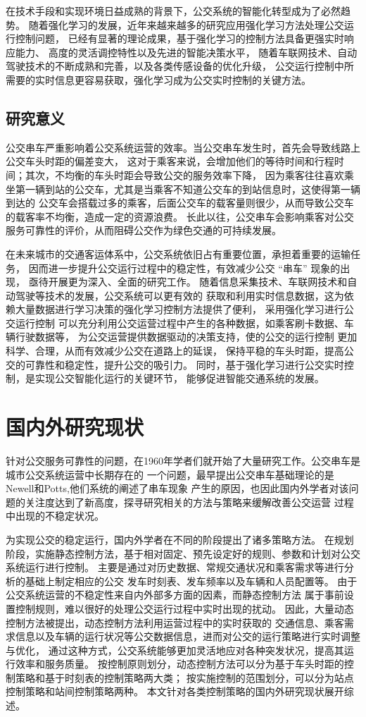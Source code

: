 在技术手段和实现环境日益成熟的背景下，公交系统的智能化转型成为了必然趋势。
随着强化学习的发展，近年来越来越多的研究应用强化学习方法处理公交运行控制问题，
已经有显著的理论成果，基于强化学习的控制方法具备更强实时响应能力、
高度的灵活调控特性以及先进的智能决策水平，
随着车联网技术、自动驾驶技术的不断成熟和完善，以及各类传感设备的优化升级，
公交运行控制中所需要的实时信息更容易获取，强化学习成为公交实时控制的关键方法。

\subsection{研究意义}

公交串车严重影响着公交系统运营的效率。当公交串车发生时，首先会导致线路上公交车头时距的偏差变大，
这对于乘客来说，会增加他们的等待时间和行程时间；其次，不均衡的车头时距会导致公交的服务效率下降，
因为乘客往往喜欢乘坐第一辆到站的公交车，尤其是当乘客不知道公交车的到站信息时，这使得第一辆到达的
公交车会搭载过多的乘客，后面公交车的载客量则很少，从而导致公交车的载客率不均衡，造成一定的资源浪费。
长此以往，公交串车会影响乘客对公交服务可靠性的评价，从而阻碍公交作为绿色交通的可持续发展。

在未来城市的交通客运体系中，公交系统依旧占有重要位置，承担着重要的运输任务，
因而进一步提升公交运行过程中的稳定性，有效减少公交 “串车” 现象的出现，
亟待开展更为深入、全面的研究工作。
随着信息采集技术、车联网技术和自动驾驶等技术的发展，公交系统可以更有效的
获取和利用实时信息数据，这为依赖大量数据进行学习决策的强化学习控制方法提供了便利，
采用强化学习进行公交运行控制
可以充分利用公交运营过程中产生的各种数据，如乘客刷卡数据、车辆行驶数据等，
为公交运营提供数据驱动的决策支持，使的公交的运行控制
更加科学、合理，从而有效减少公交在道路上的延误，
保持平稳的车头时距，提高公交的可靠性和稳定性，提升公交的吸引力。
同时，基于强化学习进行公交实时控制，是实现公交智能化运行的关键环节，
能够促进智能交通系统的发展。

\section{国内外研究现状}
针对公交服务可靠性的问题，在1960年学者们就开始了大量研究工作。公交串车是城市公交系统运营中长期存在的
一个问题，最早提出公交串车基础理论的是Newell和Potts\cite{Newell1964},他们系统的阐述了串车现象
产生的原因，也因此国内外学者对该问题的关注度达到了新高度，探寻研究相关的方法与策略来缓解改善公交运营
过程中出现的不稳定状况。

为实现公交的稳定运行，国内外学者在不同的阶段提出了诸多策略方法。
在规划阶段，实施静态控制方法，基于相对固定、预先设定好的规则、参数和计划对公交系统运行进行控制。
主要是通过对历史数据、常规交通状况和乘客需求等进行分析的基础上制定相应的公交
发车时刻表、发车频率以及车辆和人员配置等。
由于公交系统运营的不稳定性来自内外部多方面的因素，而静态控制方法
属于事前设置控制规则，难以很好的处理公交运行过程中实时出现的扰动。
因此，大量动态控制方法被提出，动态控制方法利用运营过程中的实时获取的
交通信息、乘客需求信息以及车辆的运行状况等公交数据信息，进而对公交的运行策略进行实时调整与优化，
通过这种方式，公交系统能够更加灵活地应对各种突发状况，提高其运行效率和服务质量。
按控制原则划分，动态控制方法可以分为基于车头时距的控制策略和基于时刻表的控制策略两大类；
按实施控制的范围划分，可以分为站点控制策略和站间控制策略两种。
本文针对各类控制策略的国内外研究现状展开综述。
